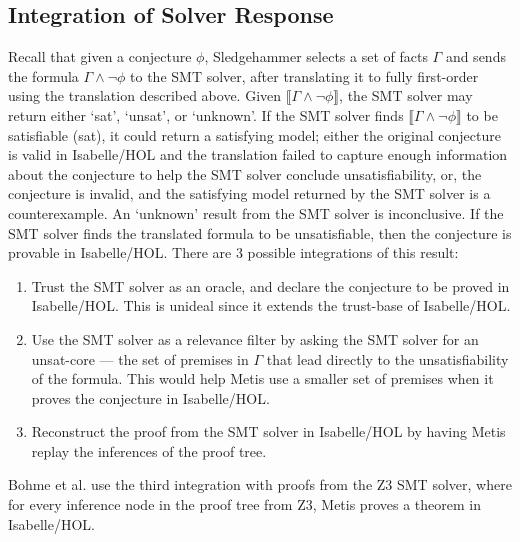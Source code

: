 \documentclass[11pt]{article}
\begin{document}
	\subsection{Integration of Solver Response}
	Recall that given a conjecture $\phi$, 
	Sledgehammer selects a set of facts 
	$\Gamma$ and sends the formula 
	$\Gamma \land \neg \phi$ to the SMT solver,
	after translating it to fully first-order
	using the translation described above.
	Given $\llbracket \Gamma \land 
	\neg \phi \rrbracket$, the SMT solver may 
	return either `sat', `unsat',
	or `unknown'. If the SMT solver finds 
	$\llbracket \Gamma \land 
	\neg \phi \rrbracket$ to be satisfiable
	(sat), it could return a satisfying model;
	either the original conjecture is valid
	in Isabelle/HOL and the translation 
	failed to capture enough information
	about the conjecture to help the 
	SMT solver conclude unsatisfiability, 
	or, the conjecture is invalid, and the 
	satisfying model returned by the SMT 
	solver is a counterexample. An 
	`unknown' result from the SMT 
	solver is inconclusive. If the
	SMT solver finds the translated
	formula to be unsatisfiable, then 
	the conjecture is provable in
	Isabelle/HOL. There are 3 possible 
	integrations of this result:
	\begin{enumerate}
		\item Trust the SMT solver as an oracle, 
		and declare the conjecture to be proved in 
		Isabelle/HOL. This is unideal since 
		it extends the trust-base of Isabelle/HOL.
		\item Use the SMT solver as a relevance 
		filter by asking the SMT solver for 
		an unsat-core --- the set of premises 
		in $\Gamma$ that lead directly to 
		the unsatisfiability of the formula. 
		This would help Metis use a smaller
		set of premises when it proves the 
		conjecture in Isabelle/HOL.
		\item Reconstruct the proof from the 
		SMT solver in Isabelle/HOL by having
		Metis replay the inferences of 
		the proof tree.
	\end{enumerate}
	Bohme et al. use the third integration 
	with proofs from the Z3 SMT solver, 
	where for every inference node in the 
	proof tree from Z3, Metis proves a 
	theorem in Isabelle/HOL.
	
	
	
	
\end{document}
